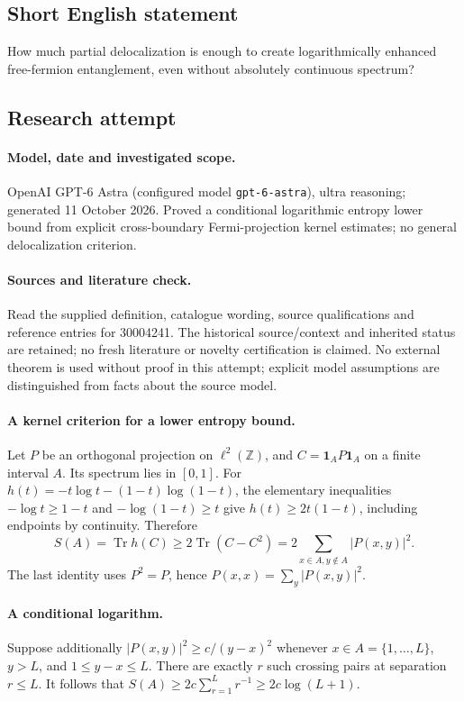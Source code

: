 \documentclass[11pt]{article}
\begin{document}
\subsection{Short English statement}
How much partial delocalization is enough to create logarithmically enhanced free-fermion entanglement, even without absolutely continuous spectrum?
\subsection{Research attempt}
\paragraph{Model, date and investigated scope.}
OpenAI GPT-6 Astra (configured model \texttt{gpt-6-astra}), ultra reasoning; generated 11 October 2026. Proved a conditional logarithmic entropy lower bound from explicit cross-boundary Fermi-projection kernel estimates; no general delocalization criterion.

\paragraph{Sources and literature check.}
Read the supplied definition, catalogue wording, source qualifications and reference entries for 30004241. The historical source/context and inherited status are retained; no fresh literature or novelty certification is claimed. No external theorem is used without proof in this attempt; explicit model assumptions are distinguished from facts about the source model.

\paragraph{A kernel criterion for a lower entropy bound.} Let \(P\) be an orthogonal projection on \(\ell^2(\mathbb Z)\), and \(C=\mathbf1_A P\mathbf1_A\) on a finite interval \(A\). Its spectrum lies in \([0,1]\). For \(h(t)=-t\log t-(1-t)\log(1-t)\), the elementary inequalities \(-\log t\ge1-t\) and \(-\log(1-t)\ge t\) give \(h(t)\ge2t(1-t)\), including endpoints by continuity. Therefore
\[
 S(A)=\operatorname{Tr}h(C)\ge2\operatorname{Tr}(C-C^2)
 =2\sum_{x\in A,y\notin A}|P(x,y)|^2.
\]
The last identity uses \(P^2=P\), hence \(P(x,x)=\sum_y|P(x,y)|^2\).
\paragraph{A conditional logarithm.} Suppose additionally \(|P(x,y)|^2\ge c/(y-x)^2\) whenever \(x\in A=\{1,\ldots,L\}\), \(y>L\), and \(1\le y-x\le L\). There are exactly \(r\) such crossing pairs at separation \(r\le L\). It follows that \(S(A)\ge2c\sum_{r=1}^Lr^{-1}\ge2c\log(L+1)\).
\end{document}
